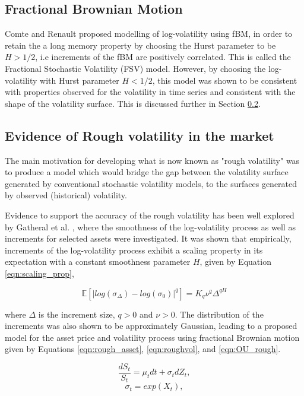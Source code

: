 \documentclass[12pt,oneside]{article}
\begin{document}
\subsection{Fractional Brownian Motion}

Comte and Renault \cite{ComteRenault1998} proposed modelling of log-volatility using fBM, in order to retain the a long memory property by choosing the Hurst parameter to be $H>1/2$, i.e increments of the fBM are positively correlated. This is called the Fractional Stochastic Volatility (FSV) model. However, by choosing the log-volatility with Hurst parameter $H<1/2$, this model was shown to be consistent with properties observed for the volatility in time series and consistent with the shape of the volatility surface. This is discussed further in Section \ref{sec:rough_vol_evidence}.

\subsection{Evidence of Rough volatility in the market}
\label{sec:rough_vol_evidence}
The main motivation for developing what is now known as "rough volatility" was to produce a model which would bridge the gap between the volatility surface generated by conventional stochastic volatility models, to the surfaces generated by observed (historical) volatility. 

Evidence to support the accuracy of the rough volatility  has been well explored by Gatheral et al. \cite{gatheral2014volatility}, where the smoothness of the log-volatility process as well as increments for selected assets were investigated. It was shown that empirically, increments of the log-volatility process exhibit a scaling property in its expectation with a constant smoothness parameter $H$, given by Equation \ref{eqn:scaling_prop},

\begin{equation}
\label{eqn:scaling_prop}
\mathbb{E}[|log(\sigma_\Delta)-log(\sigma_0)|^q]=K_q\nu^q\Delta^{qH}
\end{equation}

where $\Delta$ is the increment size, $q>0$ and $\nu>0$. The distribution of the increments was also shown to be  approximately Gaussian, leading  to a proposed model for the asset price and volatility process using fractional Brownian motion given by Equations \ref{eqn:rough_asset}, \ref{eqn:roughvol}, and \ref{eqn:OU_rough}.

\begin{equation}
\label{eqn:rough_asset}
 \frac{dS_{t}}{S_{t}} = \mu_{t} dt + \sigma_{t} dZ_{t},
\end{equation}
\begin{equation}
\label{eqn:roughvol}
    \sigma_{t} = exp(X_{t}),
\end{equation}
\end{document}
